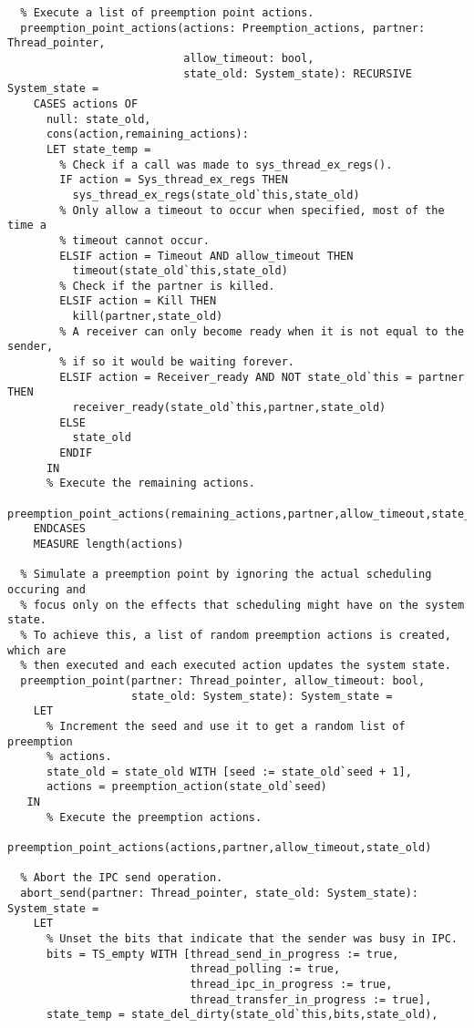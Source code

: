 \begin{lstlisting}
  % Execute a list of preemption point actions.
  preemption_point_actions(actions: Preemption_actions, partner: Thread_pointer,
                           allow_timeout: bool, 
                           state_old: System_state): RECURSIVE System_state =
    CASES actions OF
      null: state_old,
      cons(action,remaining_actions):
      LET state_temp = 
        % Check if a call was made to sys_thread_ex_regs().
        IF action = Sys_thread_ex_regs THEN
          sys_thread_ex_regs(state_old`this,state_old)
        % Only allow a timeout to occur when specified, most of the time a 
        % timeout cannot occur.
        ELSIF action = Timeout AND allow_timeout THEN
          timeout(state_old`this,state_old)
        % Check if the partner is killed.
        ELSIF action = Kill THEN
          kill(partner,state_old)
        % A receiver can only become ready when it is not equal to the sender,
        % if so it would be waiting forever.
        ELSIF action = Receiver_ready AND NOT state_old`this = partner THEN
          receiver_ready(state_old`this,partner,state_old)
        ELSE
          state_old
        ENDIF
      IN
      % Execute the remaining actions.
      preemption_point_actions(remaining_actions,partner,allow_timeout,state_temp)
    ENDCASES
    MEASURE length(actions)

  % Simulate a preemption point by ignoring the actual scheduling occuring and
  % focus only on the effects that scheduling might have on the system state. 
  % To achieve this, a list of random preemption actions is created, which are 
  % then executed and each executed action updates the system state.
  preemption_point(partner: Thread_pointer, allow_timeout: bool, 
                   state_old: System_state): System_state =
    LET 
      % Increment the seed and use it to get a random list of preemption 
      % actions.
      state_old = state_old WITH [seed := state_old`seed + 1],
      actions = preemption_action(state_old`seed)
   IN
      % Execute the preemption actions.
      preemption_point_actions(actions,partner,allow_timeout,state_old)
    
  % Abort the IPC send operation.
  abort_send(partner: Thread_pointer, state_old: System_state): System_state =
    LET
      % Unset the bits that indicate that the sender was busy in IPC.
      bits = TS_empty WITH [thread_send_in_progress := true,
                            thread_polling := true,
                            thread_ipc_in_progress := true,
                            thread_transfer_in_progress := true],
      state_temp = state_del_dirty(state_old`this,bits,state_old),


\end{lstlisting}
